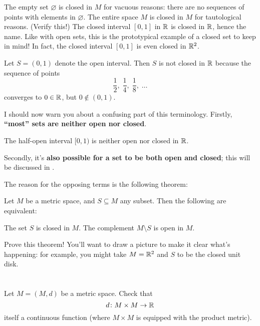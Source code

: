 \begin{example}
	\listhack
	\begin{enumerate}[(a)]
		\ii The empty set $\varnothing$ is closed in $M$ for vacuous reasons:
		there are no sequences of points with elements in $\varnothing$.
		\ii The entire space $M$ is closed in $M$ for tautological reasons.
		(Verify this!)
		\ii The closed interval $[0,1]$ in $\mathbb R$ is closed in $\mathbb R$, hence the name.  Like with open sets, this is the prototypical example of a closed set to keep in mind!
		\ii In fact, the closed interval $[0,1]$ is even closed in $\mathbb R^2$.
	\end{enumerate}
\end{example}
\begin{example}
	Let $S=(0,1)$ denote the open interval.
	Then $S$ is not closed in $\mathbb R$
	because the sequence of points
	\[
		\frac12, \;
		\frac14, \;
		\frac18, \;
		\dots
	\]
	converges to $0 \in \mathbb R$, but $0 \notin (0,1)$.
\end{example}

I should now warn you about a confusing part of this terminology.
Firstly, \textbf{``most'' sets are neither open nor closed}.
\begin{example}
	The half-open interval $[0,1)$ %
	is neither open nor closed in $\mathbb R$.
\end{example}
Secondly, it's \textbf{also possible for a set to be both open and closed};
this will be discussed in .

The reason for the opposing terms is the following theorem:
\begin{theorem}
	Let $M$ be a metric space, and $S \subseteq M$ any subset.
	Then the following are equivalent:
	\begin{itemize}
		\ii The set $S$ is closed in $M$.
		\ii The complement $M \setminus S$ is open in $M$.
	\end{itemize}
\end{theorem}
\begin{exercise}
	[Great]
	Prove this theorem!
	You'll want to draw a picture to make it clear what's happening:
	for example, you might take $M = \mathbb R^2$ and $S$ to be the closed unit disk.
\end{exercise}

\section{\problemhead}
\begin{problem}
	Let $M = (M,d)$ be a metric space.
	Check that \[ d \colon M \times M \to \mathbb R \]
	itself a continuous function
	(where $M \times M$ is equipped with the product metric).
\end{problem}

